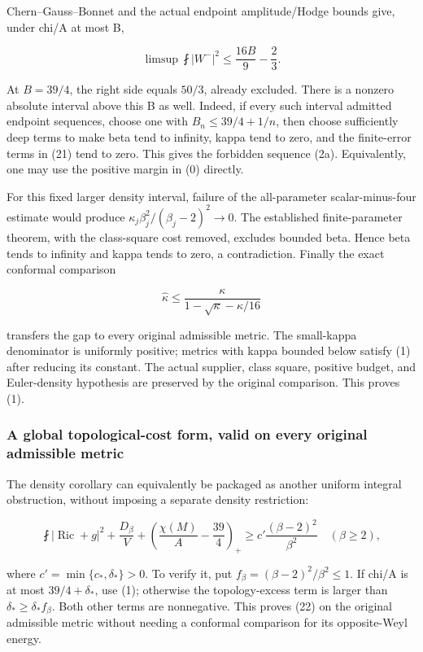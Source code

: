 \documentclass[11pt]{article}
\begin{document}
Chern--Gauss--Bonnet and the actual endpoint amplitude/Hodge bounds
give, under chi/A at most B,

\[
 \limsup\fint|W^-|^2\le\frac{16B}{9}-\frac23.
\tag{21}
\]

At \(B=39/4\), the right side equals \(50/3\), already excluded. There
is a nonzero absolute interval above this B as well. Indeed, if every
such interval admitted endpoint sequences, choose one with
\(B_n\le39/4+1/n\), then choose sufficiently deep terms to make beta
tend to infinity, kappa tend to zero, and the finite-error terms in (21)
tend to zero. This gives the forbidden sequence (2a). Equivalently, one
may use the positive margin in (0) directly.

For this fixed larger density interval, failure of the all-parameter
scalar-minus-four estimate would produce
\(\kappa_j\beta_j^2/(\beta_j-2)^2\to0\). The established
finite-parameter theorem, with the class-square cost removed, excludes
bounded beta. Hence beta tends to infinity and kappa tends to zero, a
contradiction. Finally the exact conformal comparison

\[
 \widehat\kappa\le\frac{\kappa}{1-\sqrt\kappa-\kappa/16}
\]

transfers the gap to every original admissible metric. The small-kappa
denominator is uniformly positive; metrics with kappa bounded below
satisfy (1) after reducing its constant. The actual supplier, class
square, positive budget, and Euler-density hypothesis are preserved by
the original comparison. This proves (1).

\hypertarget{o10strength:a-global-topological-cost-form-valid-on-every-original-admissible-metric}{%
\subsubsection{A global topological-cost form, valid on every original
admissible
metric}\label{o10strength:a-global-topological-cost-form-valid-on-every-original-admissible-metric}}

The density corollary can equivalently be packaged as another uniform
integral obstruction, without imposing a separate density restriction:

\[
 \boxed{\fint|\operatorname{Ric}+g|^2+\frac{D_\beta}V
 +\left(\frac{\chi(M)}A-\frac{39}{4}\right)_+
 \ge c'\frac{(\beta-2)^2}{\beta^2}\quad(\beta\ge2),}
\tag{22}
\]

where \(c'=\min\{c_*,\delta_*\}>0\). To verify it, put
\(f_\beta=(\beta-2)^2/\beta^2\le1\). If chi/A is at most
\(39/4+\delta_*\), use (1); otherwise the topology-excess term is larger
than \(\delta_*\ge\delta_* f_\beta\). Both other terms are nonnegative.
This proves (22) on the original admissible metric without needing a
conformal comparison for its opposite-Weyl energy.
\end{document}
